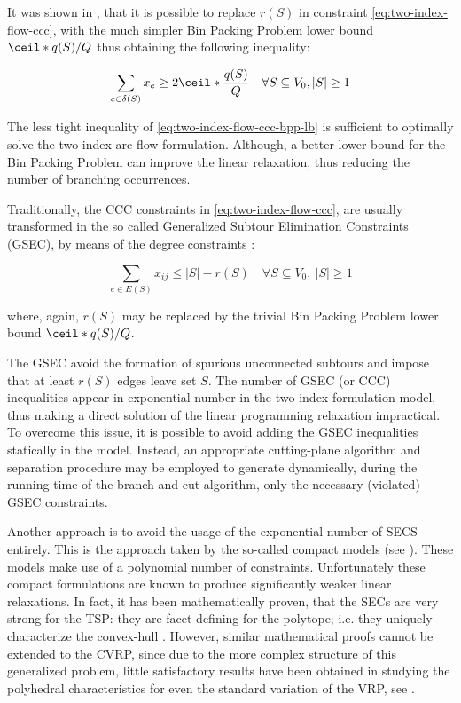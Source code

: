 It was shown in \textcite{cornuejols1993}, that it is possible to replace $r(S)$ in constraint
\eqref{eq:two-index-flow-ccc}, with the much simpler Bin Packing Problem lower bound $\ceil*{q(S) / Q}$
thus obtaining the following inequality:

\begin{equation}\label{eq:two-index-flow-ccc-bpp-lb}
	\sum_{e \in \delta(S)} x_e \ge 2 \ceil*{\frac{q(S)}{Q}}   \quad \forall S \subseteq V_0, |S| \ge 1
\end{equation}

The less tight inequality of \cref{eq:two-index-flow-ccc-bpp-lb} is sufficient to optimally solve
the two-index arc flow formulation.
Although, a better lower bound for the Bin Packing Problem can improve the linear
relaxation, thus reducing the number of branching occurrences.

Traditionally, the CCC constraints in \cref{eq:two-index-flow-ccc}, are usually transformed in the so called Generalized Subtour Elimination Constraints (GSEC),
by means of the degree constraints :

\begin{equation}\label{eq:cvrp-2flow-gsec}
	\sum_{e \in E(S)} x_{ij} \le |S| - r(S) \quad \forall S \subseteq V_0,\ |S| \ge 1
\end{equation}

where, again, $r(S)$ may be replaced by the trivial Bin Packing Problem lower bound $\ceil*{q(S) / Q}$.

The GSEC avoid the formation of spurious unconnected subtours and impose that at least $r(S)$ edges leave set $S$.
The number of GSEC (or CCC) inequalities appear in exponential number in the two-index formulation model,
thus making a direct solution of the linear programming relaxation impractical.
To overcome this issue, it is possible to avoid adding the GSEC inequalities statically in the model.
Instead, an appropriate cutting-plane algorithm and separation procedure may be employed to generate dynamically,
during the running time of the branch-and-cut algorithm,
only the necessary (violated) GSEC constraints.

Another approach is to avoid the usage of the exponential number of SECS entirely.
This is the approach taken by the so-called compact models (see \cite{miller1960, christofides1979, desrochers1991}).
These models make use of a polynomial number of constraints.
Unfortunately these compact formulations are known to produce significantly weaker linear relaxations.
In fact, it has been mathematically proven,
that the SECs are very strong for the TSP: they are facet-defining for the polytope;
i.e. they uniquely characterize the convex-hull \parencite{grotschel1975}.
However, similar mathematical proofs cannot be extended to the CVRP,
since due to the more complex structure of this generalized problem,
little satisfactory results have been obtained in studying the polyhedral characteristics
for even the standard variation of the VRP, see \textcite{campos1991, cornuejols1993}.

